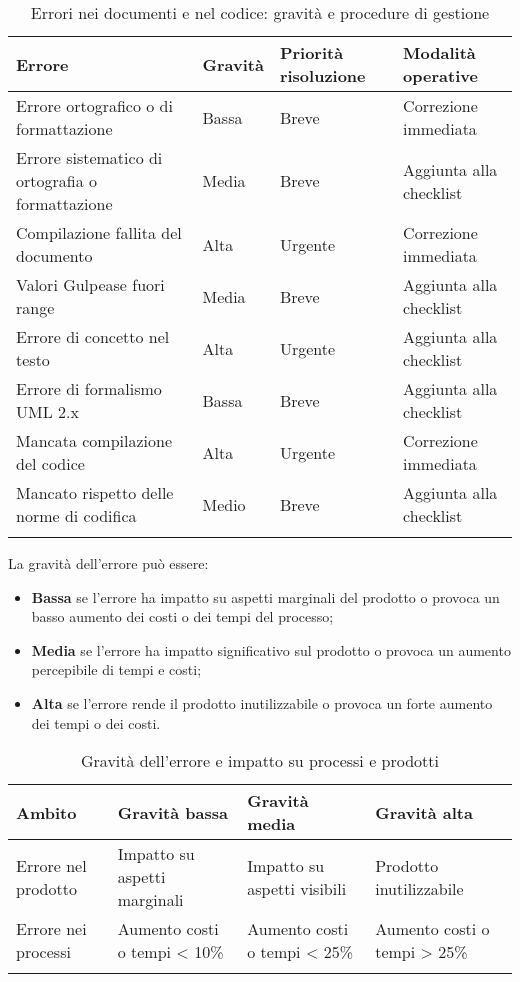 {\begin{longtable}[c]{|>{\centering\arraybackslash}m{6cm} | >{\centering\arraybackslash}m{3cm} | >{\centering\arraybackslash}m{3cm} | >{\centering\arraybackslash}m{3cm} |}
 \hline
 \textbf{Errore} & \textbf{Gravità} & \textbf{Priorità risoluzione} & \textbf{Modalità operative}\\
 \hline
 Errore ortografico o di formattazione & Bassa & Breve & Correzione immediata\\
 \hline
 Errore sistematico di ortografia o formattazione & Media & Breve & Aggiunta alla checklist\\
 \hline
 Compilazione fallita del documento & Alta & Urgente & Correzione immediata\\ 
 \hline
 Valori Gulpease fuori range & Media & Breve & Aggiunta alla checklist\\
 \hline
 Errore di concetto nel testo & Alta & Urgente & Aggiunta alla checklist\\
 \hline
 Errore di formalismo  UML  2.x & Bassa & Breve & Aggiunta alla checklist\\
 \hline
 Mancata compilazione del codice & Alta & Urgente & Correzione immediata\\ 
 \hline
 Mancato rispetto delle norme di codifica & Medio & Breve & Aggiunta alla checklist\\
 \hline
		\caption{Errori nei documenti e nel codice: gravità e procedure di gestione \label{tab:ErroriDocumentiCodice}}\\
\end{longtable}

La gravità dell’errore può essere:
\begin{itemize}
\item \textbf{Bassa} se l’errore ha impatto su aspetti marginali del prodotto o provoca un basso aumento dei costi o dei tempi del processo;
\item \textbf{Media} se l’errore ha impatto significativo sul prodotto o provoca un aumento percepibile di tempi e costi;
\item \textbf{Alta} se l’errore rende il prodotto inutilizzabile o provoca un forte aumento dei tempi o dei costi.
\end{itemize}

\begin{longtable}[c]{|>{\centering\arraybackslash}m{6cm} | >{\centering\arraybackslash}m{3cm} | >{\centering\arraybackslash}m{3cm} | >{\centering\arraybackslash}m{3cm} |}
 
 \hline
 \textbf{Ambito} & \textbf{Gravità bassa} & \textbf{Gravità media} & \textbf{Gravità alta}\\
 \hline
 Errore nel prodotto & Impatto su aspetti marginali & Impatto su aspetti visibili & Prodotto inutilizzabile\\
 \hline
 Errore nei processi & Aumento costi o tempi < 10\% & Aumento costi o tempi < 25\% & Aumento costi o tempi > 25\%\\
 \hline
		\caption{Gravità dell’errore e impatto su processi e prodotti \label{tab:GravitaErrori}}\\
\end{longtable}

}
